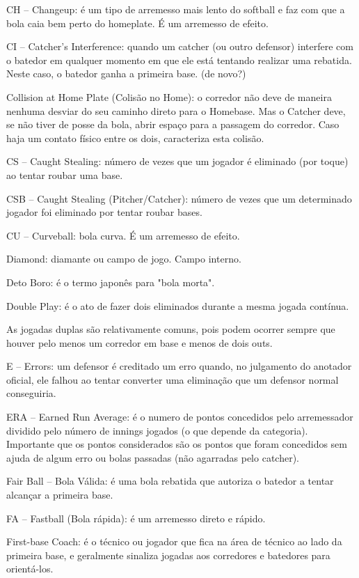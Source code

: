  CH -- Changeup: é um tipo de arremesso mais lento do softball e faz com que a bola caia bem perto do \gls{homeplate}. É um arremesso de efeito.

 CI -- Catcher's Interference: quando um catcher (ou outro defensor) interfere com o batedor em qualquer momento em que ele está tentando realizar uma
 rebatida. Neste caso, o batedor ganha a primeira base. (de novo?)

 Collision at Home Plate (Colisão no Home): o corredor não deve de maneira nenhuma desviar do seu caminho direto para o Homebase. Mas o Catcher deve,
 se não tiver de posse da bola, abrir espaço para a passagem do corredor. Caso haja um contato físico entre os dois, caracteriza esta colisão.

 CS -- Caught Stealing: número de vezes que um jogador é eliminado (por toque) ao tentar roubar uma base.

 CSB -- Caught Stealing (Pitcher/Catcher): número de vezes que um determinado jogador foi eliminado por tentar roubar bases.

 CU -- Curveball: bola curva. É um arremesso de efeito.

 Diamond: diamante ou campo de jogo. Campo interno.

 Deto Boro: é o termo japonês para "bola morta".

 Double Play: é o ato de fazer dois eliminados durante a mesma jogada contínua.

 As jogadas duplas são relativamente comuns, pois podem ocorrer sempre que houver pelo menos um corredor em base e menos de dois outs.


 E -- Errors: um defensor é creditado um erro quando, no julgamento do anotador oficial, ele falhou ao tentar converter uma eliminação que um defensor normal conseguiria.

 ERA -- Earned Run Average: é o numero de pontos concedidos pelo arremessador dividido pelo número de innings jogados (o que depende da categoria). Importante que os pontos considerados são os pontos que foram concedidos sem ajuda de algum erro ou bolas passadas (não agarradas pelo catcher).

 Fair Ball -- Bola Válida: é uma bola rebatida que autoriza o batedor a tentar alcançar a primeira base.

 FA -- Fastball (Bola rápida): é um arremesso direto e rápido.

 First-base Coach: é o técnico ou jogador que fica na área de técnico ao lado da primeira base, e geralmente sinaliza jogadas aos corredores e batedores para orientá-los.

